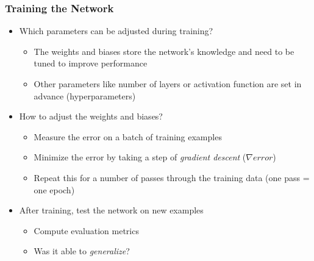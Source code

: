 \begin{frame}
  \frametitle{Training the Network}
  \begin{itemize}
    \item Which parameters can be adjusted during training?
      \begin{itemize}
        \item The weights and biases store the network's knowledge and
          need to be tuned to improve performance
        \item Other parameters like number of layers or activation
          function are set in advance (hyperparameters)
      \end{itemize}
    \item How to adjust the weights and biases?
      \begin{itemize}
        \item Measure the error on a batch of training examples
        \item Minimize the error by taking a step of \textit{gradient
          descent} (\(\nabla error\))
        \item Repeat this for a number of passes through the training
          data (one pass = one epoch)
      \end{itemize}
    \item After training, test the network on new examples
      \begin{itemize}
        \item Compute evaluation metrics
        \item Was it able to \textit{generalize}?
      \end{itemize}
  \end{itemize}
\end{frame}
